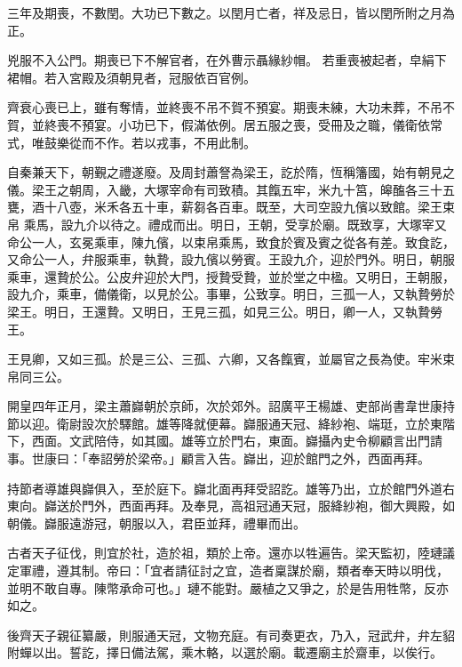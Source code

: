 \begin{pinyinscope}
 三年及期喪，不數閏。大功已下數之。以閏月亡者，祥及忌日，皆以閏所附之月為正。



 兇服不入公門。期喪已下不解官者，在外曹示聶緣紗帽。
 若重喪被起者，皁絹下裙帽。若入宮殿及須朝見者，冠服依百官例。



 齊衰心喪已上，雖有奪情，並終喪不吊不賀不預宴。期喪未練，大功未葬，不吊不賀，並終喪不預宴。小功已下，假滿依例。居五服之喪，受冊及之職，儀衛依常式，唯鼓樂從而不作。若以戎事，不用此制。



 自秦兼天下，朝覲之禮遂廢。及周封蕭詧為梁王，訖於隋，恆稱籓國，始有朝見之儀。梁王之朝周，入畿，大塚宰命有司致積。其餼五牢，米九十筥，皞醢各三十五甕，酒十八壺，米禾各五十車，薪芻各百車。既至，大司空設九儐以致館。梁王束帛
 乘馬，設九介以待之。禮成而出。明日，王朝，受享於廟。既致享，大塚宰又命公一人，玄冕乘車，陳九儐，以束帛乘馬，致食於賓及賓之從各有差。致食訖，又命公一人，弁服乘車，執贄，設九儐以勞賓。王設九介，迎於門外。明日，朝服乘車，還贄於公。公皮弁迎於大門，授贄受贄，並於堂之中楹。又明日，王朝服，設九介，乘車，備儀衛，以見於公。事畢，公致享。明日，三孤一人，又執贄勞於梁王。明日，王還贄。又明日，王見三孤，如見三公。明日，卿一人，又執贄勞王。



 王見卿，又如三孤。於是三公、三孤、六卿，又各餼賓，並屬官之長為使。牢米束帛同三公。



 開皇四年正月，梁主蕭巋朝於京師，次於郊外。詔廣平王楊雄、吏部尚書韋世康持節以迎。衛尉設次於驛館。雄等降就便幕。巋服通天冠、絳紗袍、端珽，立於東階下，西面。文武陪侍，如其國。雄等立於門右，東面。巋攝內史令柳顧言出門請事。世康曰：「奉詔勞於梁帝。」顧言入告。巋出，迎於館門之外，西面再拜。



 持節者導雄與巋俱入，至於庭下。巋北面再拜受詔訖。雄等乃出，立於館門外道右東向。巋送於門外，西面再拜。及奉見，高祖冠通天冠，服絳紗袍，御大興殿，如朝儀。巋服遠游冠，朝服以入，君臣並拜，禮畢而出。



 古者天子征伐，則宜於社，造於祖，類於上帝。還亦以牲遍告。梁天監初，陸璉議定軍禮，遵其制。帝曰：「宜者請征討之宜，造者稟謀於廟，類者奉天時以明伐，並明不敢自專。陳幣承命可也。」璉不能對。嚴植之又爭之，於是告用牲幣，反亦如之。



 後齊天子親征纂嚴，則服通天冠，文物充庭。有司奏更衣，乃入，冠武弁，弁左貂附蟬以出。誓訖，擇日備法駕，乘木輅，以選於廟。載遷廟主於齋車，以俟行。




\end{pinyinscope}
